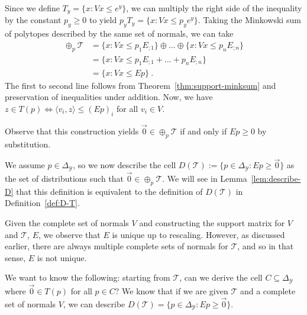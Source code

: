 \documentclass[final]{colt2020} %
\newcommand{\simplex}{\Delta_\Y}
\newcommand{\T}{\mathcal{T}}
\newcommand{\Y}{\mathcal{Y}}
\newcommand{\inprod}[2]{\langle #1, #2 \rangle}%
\begin{document}
Since we define $T_y = \{x : Vx \leq e^y\}$, we can multiply the right side of the inequality by the constant $p_y \geq  0$ to yield $p_y T_y = \{x : Vx \leq p_y e^y\}$.
Taking the Minkowski sum of polytopes described by the same set of normals, we can take 
\begin{align*}
\oplus_p \T &= \{x : Vx \leq p_1 E_{;1}\} \oplus \ldots \oplus \{x : Vx \leq p_n E_{;n}\} \\
&= \{x : Vx \leq p_1 E_{;1} + \ldots + p_n E_{;n}\}\\
&= \{x : Vx \leq E p\}~.~
\end{align*}
The first to second line follows from Theorem~\ref{thm:support-minksum} and preservation of inequalities under addition.
Now, we have $z \in T(p) \iff \inprod{v_i}{z} \leq (Ep)_i$ for all $v_i \in V$.

Observe that this construction yields $\vec 0 \in \oplus_p \T$ if and only if $E p \geq 0$ by substitution.  

We assume $p \in \simplex$, so we now describe the cell $D(\T) := \{p \in \simplex : Ep \geq \vec 0\}$ as the set of distributions such that $\vec 0 \in \oplus_p \T$.
We will see in Lemma~\ref{lem:describe-D} that this definition is equivalent to the definition of $D(\T)$ in Definition~\ref{def:D-T}.

Given the complete set of normals $V$ and constructing the support matrix for $V$ and $\T$, $E$, we observe that $E$ is unique up to rescaling.
However, as discussed earlier, there are always multiple complete sets of normals for $\T$, and so in that sense, $E$ is not unique.


We want to know the following: starting from $\T$, can we derive the cell $C \subseteq \simplex$ where $\vec 0 \in T(p)$ for all $p \in C$?
We know that if we are given $\T$ and a complete set of normals $V$, we can describe $D(\T) = \{p \in \simplex : Ep \geq \vec 0\}$.
\end{document}
